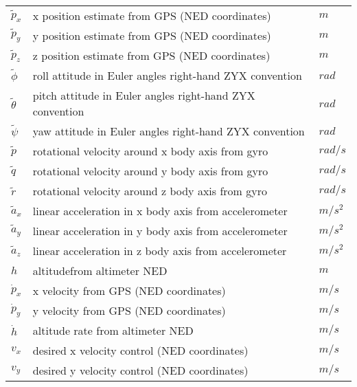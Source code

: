 \documentclass[a4paper,11pt]{article}
\begin{document}
\begin{tabular}{lll}
     $\tilde{p}_x$ & x position estimate from GPS (NED coordinates)            & $m$\\
     $\tilde{p}_y$ & y position estimate from GPS (NED coordinates)            & $m$\\
     $\tilde{p}_z$ & z position estimate from GPS (NED coordinates)            & $m$\\
     $\tilde{\phi}$ & roll attitude in Euler angles right-hand ZYX convention & $rad$\\
     $\tilde{\theta}$ & pitch attitude in Euler angles right-hand ZYX convention& $rad$\\
     $\tilde{\psi}$ & yaw attitude in Euler angles right-hand ZYX convention  & $rad$\\
     $\tilde{p}$  & rotational velocity around x body axis from gyro                 & $rad/s$\\ 
     $\tilde{q}$  & rotational velocity around y body axis from gyro                 & $rad/s$\\ 
     $\tilde{r}$  & rotational velocity around z body axis from gyro                & $rad/s$\\
     $\tilde{a}_x$ & linear acceleration in x body axis from accelerometer            & $m/s^2$\\
     $\tilde{a}_y$ & linear acceleration in y body axis from accelerometer             & $m/s^2$\\
     $\tilde{a}_z$ & linear acceleration in z body axis from accelerometer             & $m/s^2$\\
     $h$& altitude\footnotemark  from altimeter NED & $m$\\
     $\dot{p}_x$ & x velocity from GPS (NED coordinates)            & $m/s$\\
     $\dot{p}_y$ & y velocity from GPS (NED coordinates)            & $m/s$\\
     $\dot{h}$    & altitude rate from altimeter NED                   & $m/s$\\
     $v_x$ & desired x velocity control (NED coordinates)            & $m/s$\\ 
     $v_y$ & desired y velocity control (NED coordinates)            & $m/s$\\
\end{tabular} 
\end{document}
